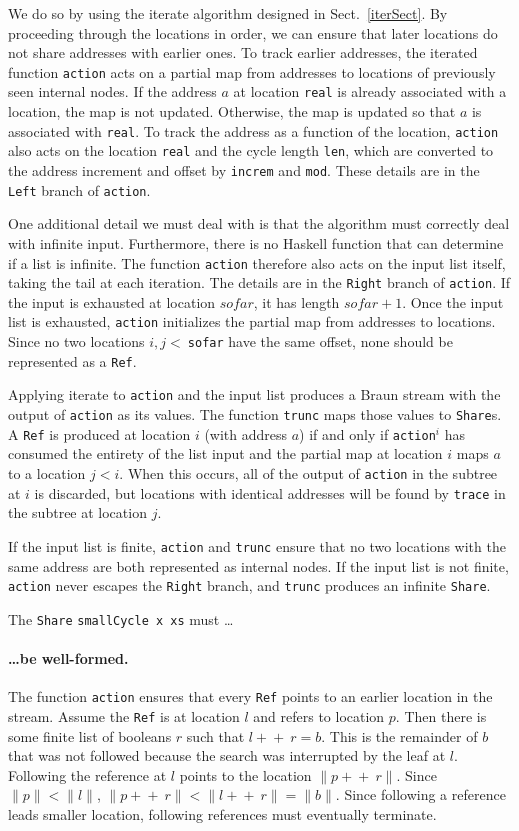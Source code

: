 \documentclass[envcountsect]{llncs}
\newcommand{\ord}[1]{\|#1\|}
\newcommand{\app}{+\!\!\!+\ }
\newcommand{\share}{{\tt Share} }
\begin{document}
We do so by using the iterate algorithm designed in Sect.~\ref{iterSect}.
By proceeding through the locations in order, we can ensure that later locations do not share addresses with earlier ones.
To track earlier addresses, the iterated function {\tt action} acts on a partial map from addresses to locations of previously seen internal nodes.
If the address $a$ at location {\tt real} is already associated with a location, the map is not updated.
Otherwise, the map is updated so that $a$ is associated with {\tt real}.
To track the address as a function of the location, {\tt action} also acts on the location {\tt real} and the cycle length {\tt len}, which are converted to the address increment and offset by {\tt increm} and {\tt mod}.
These details are in the {\tt Left} branch of {\tt action}.

One additional detail we must deal with is that the algorithm must correctly deal with infinite input.
Furthermore, there is no Haskell function that can determine if a list is infinite.
The function {\tt action} therefore also acts on the input list itself, taking the tail at each iteration.
The details are in the {\tt Right} branch of {\tt action}.
If the input is exhausted at location $sofar$, it has length $sofar+1$.
Once the input list is exhausted, {\tt action} initializes the partial map from addresses to locations.
Since no two locations $i,j <\ ${\tt sofar} have the same offset, none should be represented as a {\tt Ref}.

Applying iterate to {\tt action} and the input list produces a Braun stream with the output of {\tt action} as its values.
The function {\tt trunc} maps those values to {\tt Share}s.
A {\tt Ref} is produced at location $i$ (with address $a$) if and only if {\tt action}$^i$ has consumed the entirety of the list input and the partial map at location $i$ maps $a$ to a location $j < i$.
When this occurs, all of the output of {\tt action} in the subtree at $i$ is discarded, but locations with identical addresses will be found by {\tt trace} in the subtree at location $j$.

If the input list is finite, {\tt action} and {\tt trunc} ensure that no two locations with the same address are both represented as internal nodes.
If the input list is not finite, {\tt action} never escapes the {\tt Right} branch, and {\tt trunc} produces an infinite {\tt Share}.

The \share {\tt smallCycle x xs} must \ldots

\paragraph{\ldots be well-formed.}
The function {\tt action} ensures that every {\tt Ref} points to an earlier location in the stream.
Assume the {\tt Ref} is at location $l$ and refers to location $p$.
Then there is some finite list of booleans $r$ such that $l \app r = b$.
This is the remainder of $b$ that was not followed because the search was interrupted by the leaf at $l$.
Following the reference at $l$ points to the location $\ord{p \app r}$.
Since $\ord{p} < \ord{l}$, $\ord{p \app r} < \ord{l \app r} = \ord{b}$.
Since following a reference leads smaller location, following references must eventually terminate.
\end{document}
